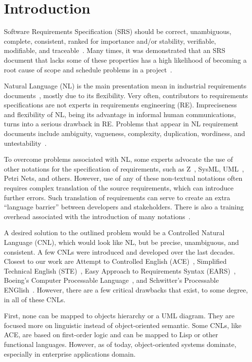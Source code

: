 \documentclass[sigplan,10pt,screen]{acmart}
\newcommand{\nospell}[1]{#1}
\begin{document}
\section{Introduction}
\label{sec:intro}

Software Requirements Specification (SRS) should be correct, unambiguous,
complete, consistent, ranked for importance and/or stability, verifiable,
modifiable, and traceable~\citep{ieee830}. Many times, it was demonstrated that an SRS
document that lacks some of these properties has a high likelihood of
becoming a root cause of scope and schedule problems in a
project~\citep{wiegers03,ears09,chen09}.

Natural Language (NL) is the main presentation mean in industrial
requirements documents~\citep{kof10,sinha10}, mostly due to its flexibility.
Very often, contributors to requirements specifications are not experts in
requirements engineering (RE). Impreciseness and flexibility of NL, being
its advantage in informal human communications, turns into a serious drawback
in RE. Problems that appear in NL requirement documents include
ambiguity, vagueness, complexity, duplication, wordiness, and
\nospell{untestability}~\citep{ears09}.

To overcome problems associated with NL, some experts advocate the use of
other notations for the specification of requirements, such as
Z~\citep{woodcock96}, SysML, UML~\citep{uml}, Petri Nets, and others. However,
use of any of these non-textual notations often requires complex translation
of the source requirements, which can introduce further errors. Such
translation of requirements can serve to create an extra ``language
barrier'' between developers and stakeholders. There is also a training
overhead associated with the introduction of many notations~\citep{ears09}.

A desired solution to the outlined problem would be a Controlled Natural
Language (CNL), which would look like NL, but be precise,
unambiguous, and consistent. A few CNLs were introduced and developed over
the last decades. Closest to our work are Attempt to Controlled English
(ACE)~\citep{ace06}, Simplified Technical English (STE)~\citep{ste05}, Easy
Approach to Requirements Syntax (EARS)~\citep{ears09}, Boeing's Computer
Processable Language~\citep{clark05}, and \nospell{Schwitter's Processable
ENGlish}~\citep{peng}. However, there are a few critical drawbacks that exist,
to some degree, in all of these CNLs.

First, none can be mapped to objects hierarchy or a UML diagram.
They are focused more on linguistic instead of object-oriented semantic.
Some CNLs, like ACE, are based on first-order logic and can be mapped to
Lisp or other functional languages. However, as of today, object-oriented
systems dominate, especially in enterprise applications domain.
\end{document}

